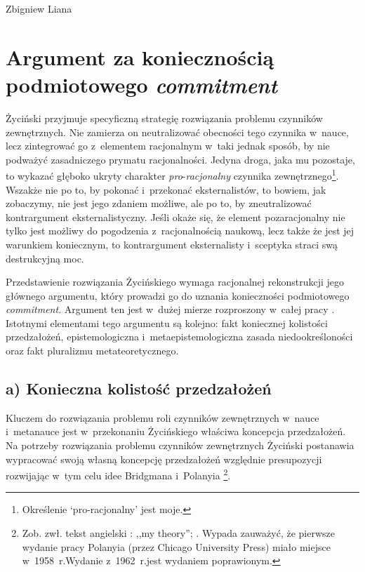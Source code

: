 \begin{artplenv}{Zbigniew Liana}
\section{Argument za koniecznością podmiotowego \textit{commitment}}
Życiński przyjmuje specyficzną strategię rozwiązania problemu czynników zewnętrznych. Nie zamierza on neutralizować obecności tego czynnika w~nauce, lecz zintegrować go z~elementem racjonalnym w~taki jednak sposób, by nie podważyć zasadniczego prymatu racjonalności. Jedyna droga, jaka mu pozostaje, to wykazać głęboko ukryty charakter \textit{pro}-\textit{racjonalny} czynnika zewnętrznego\footnote{Określenie ‘pro-racjonalny' jest moje.}. Wszakże nie po to, by pokonać i~przekonać eksternalistów, to bowiem, jak zobaczymy, nie jest jego zdaniem możliwe, ale po to, by zneutralizować kontrargument eksternalistyczny. Jeśli okaże się, że element pozaracjonalny nie tylko jest możliwy do pogodzenia z~racjonalnością naukową, lecz także że jest jej warunkiem koniecznym, to kontrargument eksternalisty i~sceptyka straci swą destrukcyjną moc.

Przedstawienie rozwiązania Życińskiego wymaga racjonalnej rekonstrukcji jego głównego argumentu, który prowadzi go do uznania konieczności podmiotowego \textit{commitment}. Argument ten jest w~dużej mierze rozproszony w~całej pracy
\parencite[][]{zycinski_teizm_1985}. %
 Istotnymi elementami tego argumentu są kolejno: fakt koniecznej kolistości przedzałożeń, epistemologiczna i~metaepistemologiczna zasada niedookreśloności oraz fakt pluralizmu metateoretycznego.

\subsection{a) Konieczna kolistość przedzałożeń}

Kluczem do rozwiązania problemu roli czynników zewnętrznych w~nauce i~metanauce jest w~przekonaniu Życińskiego
\parencite*[][s.~7]{zycinski_teizm_1985} %
 właściwa koncepcja przedzałożeń. Na potrzeby rozwiązania problemu czynników zewnętrznych Życiński postanawia wypracować swoją własną koncepcję przedzałożeń względnie presupozycji rozwijając w~tym celu idee Bridgmana 
\parencite*[][]{bridgman_reflections_1950} %
 i~Polanyia 
\parencite*[][]{polanyi_personal_1962}%
\footnote{Zob. zwł. tekst angielski 
\parencite[][s.~202]{zycinski_structure_1988}: %
 ,,my theory''; 
\parencites[por.][s.~351]{zycinski_struktura_2013_liana}[zob. także][s.~145]{zycinski_structure_1988}[][s.~256]{zycinski_struktura_2013_liana}[][s.~187 przypis 283]{zycinski_elementy_1996}[][s.~254 przypis 18]{zycinski_elementy_2015}. %
 Wypada zauważyć, że pierwsze wydanie pracy Polanyia (przez Chicago University Press) miało miejsce w~1958~r.Wydanie z~1962~r.jest wydaniem poprawionym.}.


\end{artplenv}
